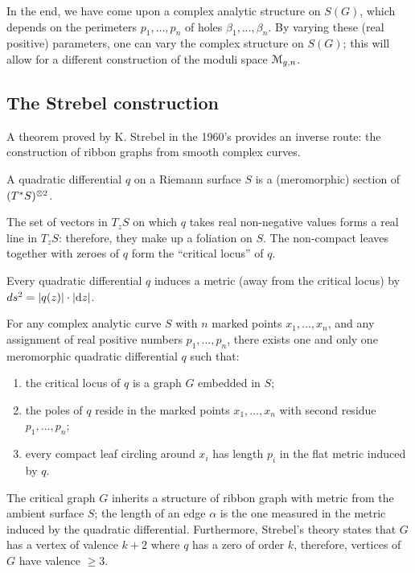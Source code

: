 In the end, we have come upon a complex analytic structure on
$S(G)$, which depends on the perimeters $p_1, \ldots, p_n$ of holes $\beta_1,
\ldots, \beta_n$. By varying these (real positive) parameters, one can vary
the complex structure on $S(G)$; this will allow for a different
construction of the moduli space $\mathcal{M}_{g,n}$.


\subsection{The Strebel construction}
\label{sec:strebel}
A theorem proved by K. Strebel in the 1960's provides an inverse
route: the construction of ribbon graphs from smooth complex curves.

\begin{definition}
  A quadratic differential $q$ on a Riemann surface $S$ is a
  (meromorphic) section of $(T^*S)\sp{\otimes 2}$.
\end{definition}
The set of vectors in $T_zS$ on which $q$ takes real non-negative
values forms a real line in $T_zS$: therefore, they make up a foliation
on $S$. The non-compact leaves together with zeroes of $q$ form the
``critical locus'' of $q$.

Every quadratic differential $q$ induces a metric (away from the
critical locus) by $ds^2 = \lvert q(z)\rvert \cdot \lvert\mathrm{d} z\rvert$.

\begin{theorem} For any complex
  analytic curve $S$ with $n$ marked points $x_1, \ldots, x_n$, and any
  assignment of real positive numbers $p_1, \ldots, p_n$, there exists one
  and only one meromorphic quadratic differential $q$ such that:
  \begin{enumerate}
  \item the critical locus of $q$ is a graph $G$ embedded in $S$;
  \item the poles of $q$ reside in the marked points $x_1, \ldots, x_n$
    with second residue $p_1, ..., p_n$;
  \item every compact leaf circling around $x_i$ has length $p_i$ in the flat
    metric induced by $q$.
  \end{enumerate}
\end{theorem}
The critical graph $G$ inherits a structure of ribbon graph with
metric from the ambient surface $S$; the length of an edge $\alpha$ is the
one measured in the metric induced by the quadratic
differential. Furthermore, Strebel's theory states that $G$ has a
vertex of valence $k+2$ where $q$ has a zero of order $k$, therefore,
vertices of $G$ have valence $\geq3$.

